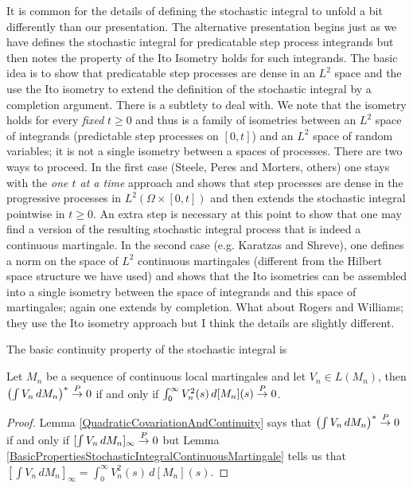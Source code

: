 It is common for the details of defining the stochastic integral to unfold a bit differently than our presentation.  The alternative presentation begins just as we have defines the stochastic integral for predicatable step process integrands but then notes the property of the Ito Isometry holds for such integrands.  The basic idea is to show that predicatable step processes are dense in an $L^2$ space and the use the Ito isometry to extend the definition of the stochastic integral by a completion argument.  There is a subtlety to deal with.  We note that the isometry holds for every \emph{fixed} $t \geq 0$ and thus is a family of isometries between an $L^2$ space of integrands (predictable step processes on $[0,t]$) and an $L^2$ space of random variables; it is not a single isometry between a spaces of processes.  There are two ways to proceed.  In the first case (Steele, Peres and Morters, others) one stays with the \emph{one $t$ at a time} approach and shows that step processes are dense in the progressive processes in $L^2(\Omega \times [0,t])$ and then extends the stochastic integral pointwise in $t \geq 0$.  An extra step is necessary at this point to show that one may find a version of the resulting stochastic integral process that is indeed a continuous martingale.  In the second case (e.g. Karatzas and Shreve), one defines a norm on the space of $L^2$ continuous martingales (different from the Hilbert space structure we have used) and shows that the Ito isometries can be assembled into a single isometry between the space of integrands and this space of martingales; again one extends by completion.  What about Rogers and Williams; they use the Ito isometry approach but I think the details are slightly different.
 
The basic continuity property of the stochastic integral is
\begin{lem}\label{LimitsOfStochasticIntegralContinuousLocalMartingale}Let $M_n$ be a sequence of continuous local martingales and let $V_n \in L(M_n)$, then 
$\left( \int V_n \, dM_n \right)^* \overset{P}\to 0$ if and only if $\int_0^\infty V_n^2(s) \, d[M_n](s) \overset{P}\to 0$.
\end{lem}
\begin{proof}
Lemma \ref{QuadraticCovariationAndContinuity} says that $\left( \int V_n \, dM_n \right)^* \overset{P}\to 0$ if and only if $[\int V_n \, dM_n]_\infty \overset{P}\to 0$ but Lemma \ref{BasicPropertiesStochasticIntegralContinuousMartingale} tells us that $[\int V_n \, dM_n]_\infty = \int_0^\infty V^2_n(s) \, d[M_n](s)$. 
\end{proof}

